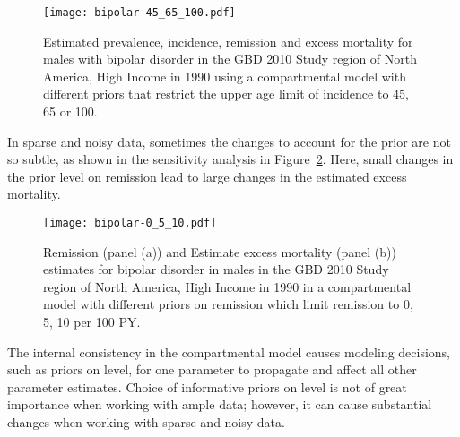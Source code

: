     \begin{figure}[h]
        \begin{center}
            \texttt{[image: bipolar-45\_65\_100.pdf]}
            \caption{Estimated prevalence, incidence, remission and
              excess mortality for males with bipolar
              disorder in the GBD 2010 Study region of North America, High Income
              in 1990 using a compartmental model with
              different priors that restrict the upper age limit of
              incidence to 45, 65 or 100.}
            \label{fig:app-bipolar onset}
        \end{center}
    \end{figure}

In sparse and noisy data, sometimes the changes to account for the prior
are not so subtle, as shown in the sensitivity analysis in
Figure~\ref{fig:app-bipolar remission}.  Here, small changes in the
prior level on remission lead to large changes in the estimated excess mortality.

    \begin{figure}[h]
        \begin{center}
            \texttt{[image: bipolar-0\_5\_10.pdf]}
            \caption{Remission (panel (a)) and Estimate excess
              mortality (panel (b)) estimates for bipolar disorder in
              males in the GBD 2010 Study region of North America, High Income
              in 1990 in a compartmental model
              with different priors on remission which limit remission
              to 0, 5, 10 per 100 PY.}
            \label{fig:app-bipolar remission}
        \end{center}
    \end{figure}

The internal consistency in the compartmental model causes modeling 
decisions, such as priors on level, for one parameter to propagate 
and affect all other parameter estimates.  Choice of informative priors 
on level is not of great importance when working with ample data; 
however, it can cause substantial changes when working with sparse 
and noisy data.




